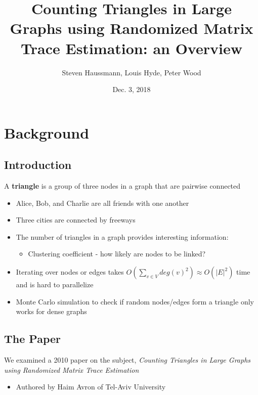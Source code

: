 \documentclass{beamer}
\title{Counting Triangles in Large Graphs using Randomized Matrix Trace Estimation: an Overview}
\author{Steven Haussmann, Louis Hyde, Peter Wood}
\date{Dec. 3, 2018}
\begin{document}
\begin{frame}
  \titlepage
\end{frame}

\section{Background}

\subsection{Introduction}

\begin{frame}
    A \textbf{triangle} is a group of three nodes in a graph that are pairwise connected
    
    \begin{itemize}
        \item Alice, Bob, and Charlie are all friends with one another
        \item Three cities are connected by freeways
    \end{itemize}
\end{frame}

\begin{frame}
\begin{itemize}
    \item The number of triangles in a graph provides interesting information:
    
    \begin{itemize}
        \item Clustering coefficient - how likely are nodes to be linked?
    \end{itemize}
    
    \item Iterating over nodes or edges takes $O(\sum_{v\in V} deg(v)^2) \approx O(|E|^2)$ time and is hard to parallelize

    \item Monte Carlo simulation to check if random nodes/edges form a triangle only works for dense graphs
\end{itemize}
\end{frame}

\subsection{The Paper}

\begin{frame}
    We examined a 2010 paper on the subject, \textit{Counting Triangles in Large Graphs using Randomized Matrix Trace Estimation}
    
    \begin{itemize}
        \item Authored by Haim Avron of Tel-Aviv University
    \end{itemize}
\end{frame}
\end{document}
